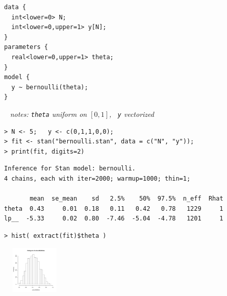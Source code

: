 \documentclass[10pt]{report}
\newcommand{\sld}[1]{\newpage{\noindent\LARGE \ \ \
    \textcolor{MidnightBlue}{\bfseries #1}}\vspace*{4pt}}
\newcommand{\spc}{\hspace*{0.25in}}
\begin{document}
\sld{Example: \ Bernoulli}
\vfill
\spc\spc
\begin{minipage}[t]{0.8\textwidth}
\begin{Verbatim}
data {
  int<lower=0> N;
  int<lower=0,upper=1> y[N];
}
parameters {
  real<lower=0,upper=1> theta;
} 
model {
  y ~ bernoulli(theta);
}
\end{Verbatim}
\end{minipage}
\vfill
\vfill
\vfill
\mbox{ } \hfill {\small\slshape notes: {\tt theta} uniform on $[0,1]$, \ {\tt y} vectorized}
\vfill


\sld{RStan Execution}

\begin{minipage}[t]{\textwidth}
\footnotesize
\begin{Verbatim}
> N <- 5;   y <- c(0,1,1,0,0);
> fit <- stan("bernoulli.stan", data = c("N", "y"));
> print(fit, digits=2)
\end{Verbatim}
\vspace*{1pt}
\begin{Verbatim}[fontshape=sl]
Inference for Stan model: bernoulli.
4 chains, each with iter=2000; warmup=1000; thin=1; 

       mean  se_mean    sd   2.5%    50%  97.5%  n_eff  Rhat
theta  0.43     0.01  0.18   0.11   0.42   0.78   1229     1
lp__  -5.33     0.02  0.80  -7.46  -5.04  -4.78   1201     1
\end{Verbatim}
\vspace*{6pt}
\begin{Verbatim}
> hist( extract(fit)$theta )
\end{Verbatim}
\vspace*{-24pt}
\hfill\includegraphics[width=1.25in,height=0.9in]{img/bernoulli-posterior-histo.pdf}
\hspace*{24pt}
\end{minipage}

\sld{Stan is Open}
\end{document}
